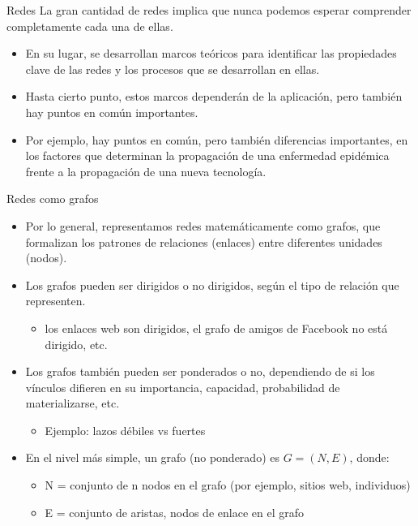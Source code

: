 \documentclass[11pt]{beamer}
\begin{document}
\begin{frame}{Redes}
La gran cantidad de redes implica que nunca podemos esperar comprender completamente cada una de ellas.
\begin{itemize}
    \item En su lugar, se desarrollan marcos teóricos para identificar las propiedades clave de las redes y los procesos que se desarrollan en ellas.
\item Hasta cierto punto, estos marcos dependerán de la aplicación, pero también hay puntos en común importantes.
\item Por ejemplo, hay puntos en común, pero también diferencias importantes, en los factores que determinan la propagación de una enfermedad epidémica frente a la propagación de una nueva tecnología.
\end{itemize}
\end{frame}


\begin{frame}{Redes como grafos}
    \begin{itemize}
        \item Por lo general, representamos redes matemáticamente como grafos, que formalizan los patrones de relaciones (enlaces) entre diferentes unidades (nodos).
\item Los grafos pueden ser dirigidos o no dirigidos, según el tipo de relación que representen.
\begin{itemize}
    \item los enlaces web son dirigidos, el grafo de amigos de Facebook no está dirigido, etc.
\end{itemize}
\item Los grafos también pueden ser ponderados o no, dependiendo de si los vínculos difieren en su importancia, capacidad, probabilidad de materializarse, etc.
\begin{itemize}
    \item Ejemplo: lazos débiles vs fuertes
\end{itemize}
\item En el nivel más simple, un grafo (no ponderado) es $G =(N,E)$, donde: 
\begin{itemize}
    \item N = conjunto de n nodos en el grafo (por ejemplo, sitios web, individuos)
\item E = conjunto de aristas, nodos de enlace en el grafo
\end{itemize}
    \end{itemize}
\end{frame}
\end{document}
